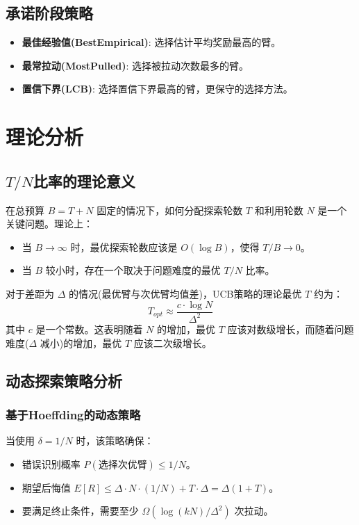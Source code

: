 \documentclass[8pt, a4paper]{ctexart} %
\newcommand{\N}{\ensuremath{N}}
\newcommand{\T}{\ensuremath{T}}
\newcommand{\kArms}{\ensuremath{k}}
\newcommand{\deltaVal}{\ensuremath{\delta}}
\newcommand{\DeltaVal}{\ensuremath{\Delta}}
\begin{document}
\subsection{承诺阶段策略}
\begin{itemize}
    \item \textbf{最佳经验值(BestEmpirical)}: 选择估计平均奖励最高的臂。
    \item \textbf{最常拉动(MostPulled)}: 选择被拉动次数最多的臂。
    \item \textbf{置信下界(LCB)}: 选择置信下界最高的臂，更保守的选择方法。
\end{itemize}

\section{理论分析}

\subsection{$\T/\N$比率的理论意义}

在总预算 $B=\T+\N$ 固定的情况下，如何分配探索轮数 $\T$ 和利用轮数 $\N$ 是一个关键问题。理论上：
\begin{itemize}
    \item 当 $B \to \infty$ 时，最优探索轮数应该是 $O(\log B)$，使得 $\T/B \to 0$。
    \item 当 $B$ 较小时，存在一个取决于问题难度的最优 $\T/\N$ 比率。
\end{itemize}

对于差距为 $\DeltaVal$ 的情况(最优臂与次优臂均值差)，UCB策略的理论最优 $\T$ 约为：
$$
\T_{opt} \approx \frac{c \cdot \log \N}{\DeltaVal^2}
$$
其中 $c$ 是一个常数。这表明随着 $\N$ 的增加，最优 $\T$ 应该对数级增长，而随着问题难度($\DeltaVal$ 减小)的增加，最优 $\T$ 应该二次级增长。

\subsection{动态探索策略分析}

\subsubsection{基于Hoeffding的动态策略}
当使用 $\deltaVal = 1/\N$ 时，该策略确保：
\begin{itemize}
    \item 错误识别概率 $P(\text{选择次优臂}) \leq 1/\N$。
    \item 期望后悔值 $E[R] \leq \DeltaVal \cdot \N \cdot (1/\N) + \T \cdot \DeltaVal = \DeltaVal(1+\T)$。
    \item 要满足终止条件，需要至少 $\Omega(\log(\kArms\N)/\DeltaVal^2)$ 次拉动。
\end{itemize}
\end{document}

